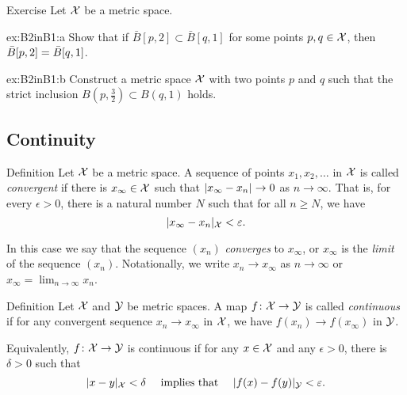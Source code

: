 \begin{thm}{Exercise}\label{ex:B2inB1}
Let $\mathcal{X}$ be a metric space.

\begin{subthm}{ex:B2inB1:a}
Show that if $\bar B[p,2]\subset \bar B[q,1]$ for some points $p,q\in \mathcal{X}$, then $\bar B[p,2]\z=\bar B[q,1]$.
\end{subthm}

\begin{subthm}{ex:B2inB1:b} Construct a metric space $\mathcal{X}$ with two points $p$ and $q$ such that the strict inclusion
$B(p,\tfrac32)\subset B(q,1)$ holds.
\end{subthm}

\end{thm}



\subsection*{Continuity}

\begin{thm}{Definition}
 Let ${\mathcal{X}}$ be a metric space.
A sequence of points $x_1, x_2, \ldots$ in ${\mathcal{X}}$ is called \emph{convergent}
if there is 
$x_\infty\in {\mathcal{X}}$ such that $\dist{x_\infty}{x_n}{}\to 0$ as $n\to\infty$.  
That is, for every $\epsilon > 0$, there is a natural number $N$ such that for all $n \ge N$, we have
\[
\dist{x_\infty}{x_n}{\spc{X}}
<
\epsilon.
\]

In this case we say that the sequence $(x_n)$ {}\emph{converges} to $x_\infty$, 
or $x_\infty$ is the {}\emph{limit} of the sequence $(x_n)$.
Notationally, we write $x_n\to x_\infty$ as $n\to\infty$
or $x_\infty=\lim_{n\to\infty} x_n$.
\end{thm}

\begin{thm}{Definition}\label{def:continuous}
Let $\mathcal{X}$ and $\mathcal{Y}$ be metric spaces.
A map $f\colon\mathcal{X}\to \mathcal{Y}$ is called \emph{continuous} if for any convergent sequence $x_n\to x_\infty$ in ${\mathcal{X}}$,
we have $f(x_n) \to f(x_\infty)$ in $\mathcal{Y}$.

Equivalently, $f\colon\mathcal{X}\to \mathcal{Y}$ is continuous if for any $x\in {\mathcal{X}}$ and any $\epsilon>0$,
there is $\delta>0$ such that 
$$\dist{x}{y}{\spc{X}}<\delta\quad \text{ implies that }\quad \dist{f(x)}{f(y)}{\spc{Y}}<\epsilon.$$

\end{thm}

